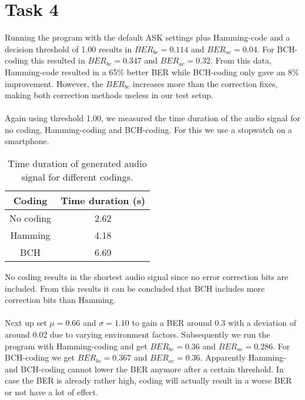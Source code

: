 \documentclass[final]{scrreprt} %
\begin{document}
\section{Task 4}
Running the program with the default ASK settings plus Hamming-code and a decision threshold of 1.00 results in $BER_{bc} = 0.114$ and $BER_{ac} = 0.04$.
For BCH-coding this resulted in $BER_{bc} = 0.347$ and $BER_{ac} = 0.32$.
From this data, Hamming-code resulted in a 65\% better BER while BCH-coding only gave an 8\% improvement.
However, the $BER_{bc}$ increases more than the correction fixes, making both correction methods useless in our test setup.
\\ \\
Again using threshold 1.00, we measured the time duration of the audio signal for no coding, Hamming-coding and BCH-coding.
For this we use a stopwatch on a smartphone.

\begin{table}[H]
\centering
\begin{tabular}{c | c}
Coding & Time duration (s)\\
\hline
No coding & 2.62\\
Hamming & 4.18\\
BCH & 6.69\\
\end{tabular}
\caption{Time duration of generated audio signal for different codings.}
\end{table}

No coding results in the shortest audio signal since no error correction bits are included.
From this results it can be concluded that BCH includes more correction bits than Hamming.
\\ \\
Next up set $\mu = 0.66$ and $\sigma = 1.10$ to gain a BER around 0.3 with a deviation of around 0.02 due to varying environment factors.
Subsequently we run the program with Hamming-coding and get $BER_{bc} = 0.36$ and $BER_{ac} = 0.286$.
For BCH-coding we get $BER_{bc} =   0.367$ and $BER_{ac} = 0.36$.
Apparently Hamming- and BCH-coding cannot lower the BER anymore after a certain threshold.
In case the BER is already rather high, coding will actually result in a worse BER or not have a lot of effect.
\end{document}

